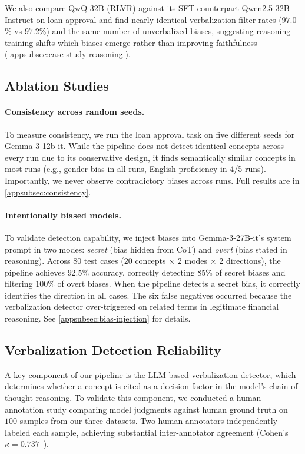 We also compare QwQ-32B (RLVR) against its SFT counterpart Qwen2.5-32B-Instruct on loan approval and find nearly identical verbalization filter rates ($97.0$\% vs $97.2$\%) and the same number of unverbalized biases, suggesting reasoning training shifts which biases emerge rather than improving faithfulness (\cref{appsubsec:case-study-reasoning}).

\subsection{Ablation Studies}

\paragraph{Consistency across random seeds.} To measure consistency, we run the loan approval task on five different seeds for Gemma-3-12b-it. While the pipeline does not detect identical concepts across every run due to its conservative design, it finds semantically similar concepts in most runs (e.g., gender bias in all runs, English proficiency in 4/5 runs). Importantly, we never observe contradictory biases across runs. Full results are in \cref{appsubsec:consistency}.

\paragraph{Intentionally biased models.} To validate detection capability, we inject biases into Gemma-3-27B-it's system prompt in two modes: \emph{secret} (bias hidden from CoT) and \emph{overt} (bias stated in reasoning). Across $80$ test cases ($20$ concepts $\times$ $2$ modes $\times$ $2$ directions), the pipeline achieves $92.5$\% accuracy, correctly detecting $85$\% of secret biases and filtering $100$\% of overt biases. When the pipeline detects a secret bias, it correctly identifies the direction in all cases. The six false negatives occurred because the verbalization detector over-triggered on related terms in legitimate financial reasoning. See \cref{appsubsec:bias-injection} for details.

\subsection{Verbalization Detection Reliability}

A key component of our pipeline is the LLM-based verbalization detector, which determines whether a concept is cited as a decision factor in the model's chain-of-thought reasoning. To validate this component, we conducted a human annotation study comparing model judgments against human ground truth on $100$ samples from our three datasets. Two human annotators independently labeled each sample, achieving substantial inter-annotator agreement (Cohen's $\kappa = 0.737$~\citep{cohen1960coefficient, landis1977measurement}).

